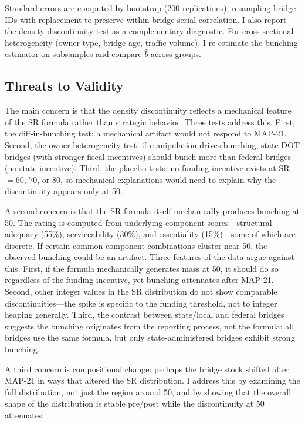 \documentclass[12pt]{article}
\begin{document}
Standard errors are computed by bootstrap (200 replications), resampling bridge IDs with replacement to preserve within-bridge serial correlation. I also report the \citet{mccrary2008manipulation} density discontinuity test as a complementary diagnostic. For cross-sectional heterogeneity (owner type, bridge age, traffic volume), I re-estimate the bunching estimator on subsamples and compare $\hat{b}$ across groups.

\subsection{Threats to Validity}

The main concern is that the density discontinuity reflects a mechanical feature of the SR formula rather than strategic behavior. Three tests address this. First, the diff-in-bunching test: a mechanical artifact would not respond to MAP-21. Second, the owner heterogeneity test: if manipulation drives bunching, state DOT bridges (with stronger fiscal incentives) should bunch more than federal bridges (no state incentive). Third, the placebo tests: no funding incentive exists at SR$=$60, 70, or 80, so mechanical explanations would need to explain why the discontinuity appears only at 50.

A second concern is that the SR formula itself mechanically produces bunching at 50. The rating is computed from underlying component scores---structural adequacy (55\%), serviceability (30\%), and essentiality (15\%)---some of which are discrete. If certain common component combinations cluster near 50, the observed bunching could be an artifact. Three features of the data argue against this. First, if the formula mechanically generates mass at 50, it should do so regardless of the funding incentive, yet bunching attenuates after MAP-21. Second, other integer values in the SR distribution do not show comparable discontinuities---the spike is specific to the funding threshold, not to integer heaping generally. Third, the contrast between state/local and federal bridges suggests the bunching originates from the reporting process, not the formula: all bridges use the same formula, but only state-administered bridges exhibit strong bunching.

A third concern is compositional change: perhaps the bridge stock shifted after MAP-21 in ways that altered the SR distribution. I address this by examining the full distribution, not just the region around 50, and by showing that the overall shape of the distribution is stable pre/post while the discontinuity at 50 attenuates.
\end{document}
